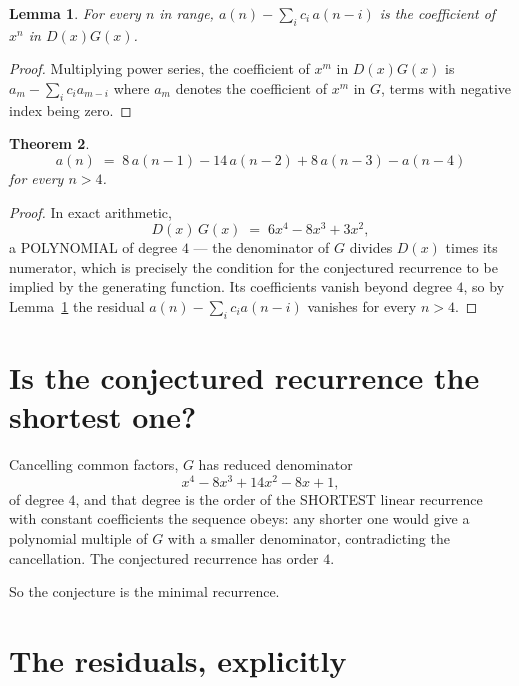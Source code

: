 \documentclass[11pt,a4paper]{article}
\theoremstyle{plain}
\newtheorem{theorem}{Theorem}
\newtheorem{lemma}[theorem]{Lemma}
\theoremstyle{definition}
\begin{document}
\begin{lemma}\label{lem:key}
For every $n$ in range, $a(n)-\sum_i c_i\,a(n-i)$ is the coefficient of $x^{n}$ in
$D(x)G(x)$.
\end{lemma}

\begin{proof}
Multiplying power series, the coefficient of $x^{m}$ in $D(x)G(x)$ is
$a_m-\sum_i c_i a_{m-i}$ where $a_m$ denotes the coefficient of $x^{m}$ in $G$, terms with
negative index being zero.
\end{proof}

\begin{theorem}
\[
a(n)\;=\;8\,a(n-1) - 14\,a(n-2) + 8\,a(n-3) - a(n-4)
\]
for every $n>4$.
\end{theorem}

\begin{proof}
In exact arithmetic,
\[
D(x)\,G(x)\;=\;6 x^{4} - 8 x^{3} + 3 x^{2},
\]
a POLYNOMIAL of degree $4$ --- the denominator of $G$ divides $D(x)$ times its numerator,
which is precisely the condition for the conjectured recurrence to be implied by the
generating function. Its coefficients vanish beyond degree $4$, so by
Lemma~\ref{lem:key} the residual $a(n)-\sum_ic_ia(n-i)$ vanishes for every
$n>4$.
\end{proof}

\section{Is the conjectured recurrence the shortest one?}

Cancelling common factors, $G$ has reduced denominator
\[
x^{4} - 8 x^{3} + 14 x^{2} - 8 x + 1,
\]
of degree $4$, and that degree is the order of the SHORTEST linear recurrence with
constant coefficients the sequence obeys: any shorter one would give a polynomial multiple of
$G$ with a smaller denominator, contradicting the cancellation. The conjectured recurrence has
order $4$.

So the conjecture is the minimal recurrence.

\section{The residuals, explicitly}
\end{document}

